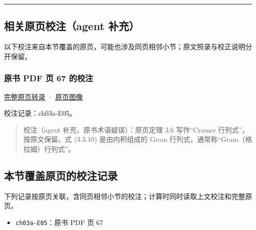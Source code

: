 \documentclass[
  10pt,
  fontset=fandol]{ctexart}
\providecommand{\tightlist}{%
  \setlength{\itemsep}{0pt}\setlength{\parskip}{0pt}}
\begin{document}
\begin{center}\rule{0.5\linewidth}{0.5pt}\end{center}

\subsection{相关原页校注（agent 补充）}\label{ux76f8ux5173ux539fux9875ux6821ux6ce8agent-ux8865ux5145}

以下校注来自本节覆盖的原页，可能也涉及同页相邻小节；原文照录与校正说明分开保留。

\subsubsection{原书 PDF 页 67 的校注}\label{ux539fux4e66-pdf-ux9875-67-ux7684ux6821ux6ce8}

\href{../pages/pdf-067.md}{完整原页转录} · \href{../../source-images/pdf-067.jpeg}{原页图像}

校注记录：ch03a-E05。

\begin{quote}
校注（agent 补充，原书术语疑误）：原页定理 3.6 写作``Cramer 行列式''，按原文保留。式 (3.3.10) 是由内积组成的 Gram 行列式，通常称``Gram（格拉姆）行列式''。
\end{quote}

\subsection{本节覆盖原页的校注记录}\label{ux672cux8282ux8986ux76d6ux539fux9875ux7684ux6821ux6ce8ux8bb0ux5f55}

下列记录按原页关联，含同页相邻小节的校注；计算时同时读取上文校注和完整原页。

\begin{itemize}
\tightlist
\item
  \texttt{ch03a-E05}：原书 PDF 页 67
\end{itemize}
\end{document}
